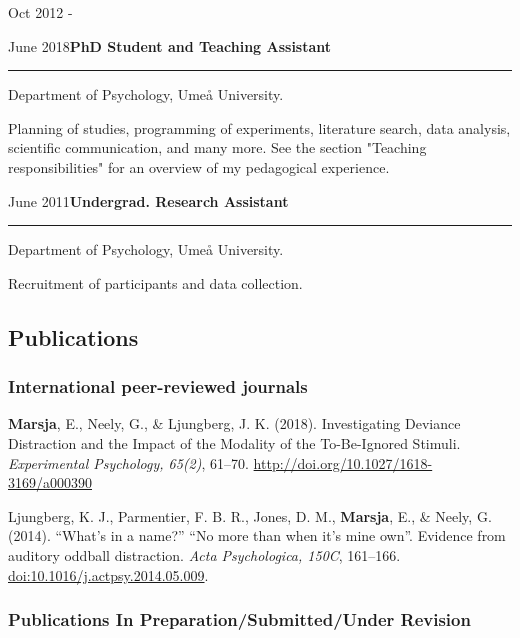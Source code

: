 \documentclass[]{article}
\begin{document}
Oct 2012 -

June 2018\hspace{0.75cm}\textbf{PhD Student and Teaching Assistant}

\hrule

\begin{changemargin}{2.3cm}{2.4cm}

Department of Psychology, Umeå University.

Planning of studies, programming of experiments, literature search, data analysis, scientific communication, and many more. See the section "Teaching responsibilities" for an overview of my pedagogical experience.


\end{changemargin}

June 2011\hspace{0.75cm}\textbf{Undergrad. Research Assistant}

\hrule

\begin{changemargin}{2.3cm}{2.4cm}


Department of Psychology, Umeå University.

Recruitment of participants and data collection.


\end{changemargin}

\subsection{Publications}\label{publications}

\subsubsection{International peer-reviewed
journals}\label{international-peer-reviewed-journals}

\textbf{Marsja}, E., Neely, G., \& Ljungberg, J. K. (2018).
Investigating Deviance Distraction and the Impact of the Modality of the
To-Be-Ignored Stimuli. \emph{Experimental Psychology, 65(2)}, 61--70.
\url{http://doi.org/10.1027/1618-3169/a000390}

Ljungberg, K. J., Parmentier, F. B. R., Jones, D. M., \textbf{Marsja},
E., \& Neely, G. (2014). ``What's in a name?'' ``No more than when it's
mine own''. Evidence from auditory oddball distraction. \emph{Acta
Psychologica, 150C}, 161--166. \url{doi:10.1016/j.actpsy.2014.05.009}.

\subsubsection{Publications In Preparation/Submitted/Under
Revision}\label{publications-in-preparationsubmittedunder-revision}
\end{document}
